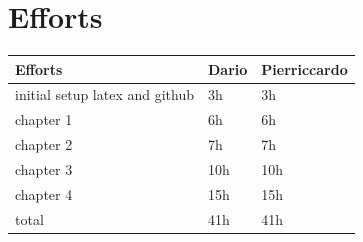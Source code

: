 \documentclass{article}
\begin{document}
\section{Efforts}
\begin{center}
    \begin{tabular}{ | l | l | l |}
        \hline
        Efforts & Dario & Pierriccardo \\
        \hline
        initial setup latex and github & 3h & 3h \\
        \hline
        chapter 1 & 6h & 6h \\
        \hline
        chapter 2 & 7h & 7h \\
        \hline
        chapter 3 & 10h & 10h \\
        \hline
        chapter 4 & 15h & 15h \\
        \hline
        total & 41h & 41h \\
        \hline
    \end{tabular}
    \end{center}
\end{document}
